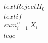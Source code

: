 \documentclass[preview]{standalone}
\begin{document}
\begin{align*}
\quad\\text{Reject } H_0 \quad\\text{ if } \quad\\sum_{i=1}^n |X_i| \quad\\leq c
\end{align*}
\end{document}
